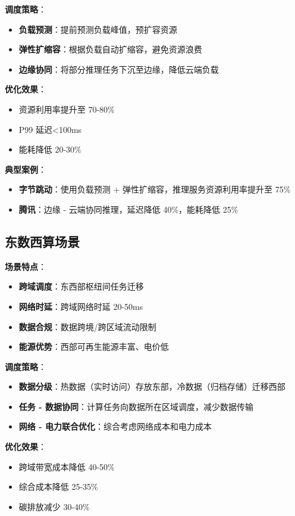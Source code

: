 \documentclass[12pt,a4paper]{article}
\begin{document}
\textbf{调度策略}：
\begin{itemize}
    \item \textbf{负载预测}：提前预测负载峰值，预扩容资源
    \item \textbf{弹性扩缩容}：根据负载自动扩缩容，避免资源浪费
    \item \textbf{边缘协同}：将部分推理任务下沉至边缘，降低云端负载
\end{itemize}

\textbf{优化效果}：
\begin{itemize}
    \item 资源利用率提升至 70-80\%
    \item P99 延迟<100ms
    \item 能耗降低 20-30\%
\end{itemize}

\textbf{典型案例}：
\begin{itemize}
    \item \textbf{字节跳动}：使用负载预测 + 弹性扩缩容，推理服务资源利用率提升至 75\%
    \item \textbf{腾讯}：边缘 - 云端协同推理，延迟降低 40\%，能耗降低 25\%
\end{itemize}

\subsection{东数西算场景}

\textbf{场景特点}：
\begin{itemize}
    \item \textbf{跨域调度}：东西部枢纽间任务迁移
    \item \textbf{网络时延}：跨域网络时延 20-50ms
    \item \textbf{数据合规}：数据跨境/跨区域流动限制
    \item \textbf{能源优势}：西部可再生能源丰富、电价低
\end{itemize}

\textbf{调度策略}：
\begin{itemize}
    \item \textbf{数据分级}：热数据（实时访问）存放东部，冷数据（归档存储）迁移西部
    \item \textbf{任务 - 数据协同}：计算任务向数据所在区域调度，减少数据传输
    \item \textbf{网络 - 电力联合优化}：综合考虑网络成本和电力成本
\end{itemize}

\textbf{优化效果}：
\begin{itemize}
    \item 跨域带宽成本降低 40-50\%
    \item 综合成本降低 25-35\%
    \item 碳排放减少 30-40\%
\end{itemize}
\end{document}
